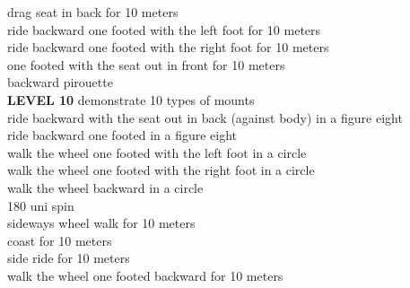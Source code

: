 drag seat in back for 10 meters\\
ride backward one footed with the left foot for 10 meters\\
ride backward one footed with the right foot for 10 meters\\
one footed with the seat out in front for 10 meters\\
backward pirouette\\
\textbf{LEVEL 10}
demonstrate 10 types of mounts\\
ride backward with the seat out in back (against body) in a figure eight\\
ride backward one footed in a figure eight\\
walk the wheel one footed with the left foot in a circle\\
walk the wheel one footed with the right foot in a circle\\
walk the wheel backward in a circle\\
180 uni spin\\
sideways wheel walk for 10 meters\\
coast for 10 meters\\
side ride for 10 meters\\
walk the wheel one footed backward for 10 meters\\
 
